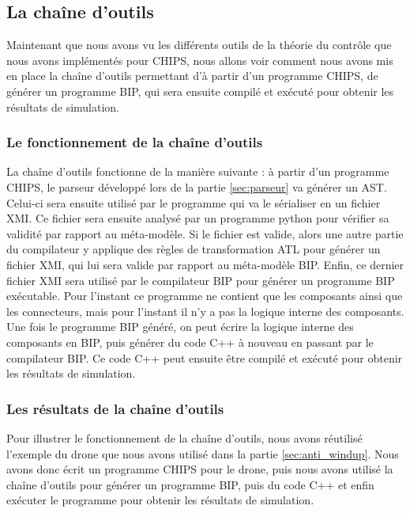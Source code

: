 \subsection{La chaîne d'outils}
\label{sec:toolchain}
Maintenant que nous avons vu les différents outils de la théorie du contrôle que nous avons implémentés pour CHIPS, nous allons voir comment nous avons mis en place la chaîne d'outils permettant d'à partir d'un programme CHIPS, de générer un programme BIP, qui sera ensuite compilé et exécuté pour obtenir les résultats de simulation. \\

\subsubsection{Le fonctionnement de la chaîne d'outils}
\label{sec:explication_toolchain}

La chaîne d'outils fonctionne de la manière suivante : à partir d'un programme CHIPS, le parseur développé lors de la partie \ref{sec:parseur} va générer un AST. Celui-ci sera ensuite utilisé par le programme qui va le sérialiser en un fichier XMI. Ce fichier sera ensuite analysé par un programme python pour vérifier sa validité par rapport au méta-modèle. 
Si le fichier est valide, alors une autre partie du compilateur y applique des règles de transformation ATL pour générer un fichier XMI, qui lui sera valide par rapport au méta-modèle BIP. Enfin, ce dernier fichier XMI sera utilisé par le compilateur BIP pour générer un programme BIP exécutable. Pour l'instant ce programme ne contient que les composants ainsi que les connecteurs, mais pour l'instant il n'y a pas la logique interne des composants. \\

Une fois le programme BIP généré, on peut écrire la logique interne des composants en BIP, puis générer du code C++ à nouveau en passant par le compilateur BIP. Ce code C++ peut ensuite être compilé et exécuté pour obtenir les résultats de simulation. \\

\subsubsection{Les résultats de la chaîne d'outils}
\label{sec:resultat_toolchain}

Pour illustrer le fonctionnement de la chaîne d'outils, nous avons réutilisé l'exemple du drone que nous avons utilisé dans la partie \ref{sec:anti_windup}. Nous avons donc écrit un programme CHIPS pour le drone, puis nous avons utilisé la chaîne d'outils pour générer un programme BIP, puis du code C++ et enfin exécuter le programme pour obtenir les résultats de simulation. \\


